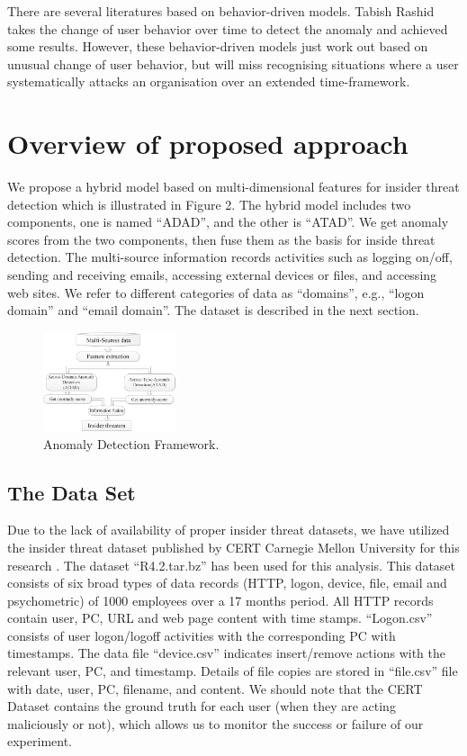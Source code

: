 \documentclass[conference]{IEEEtran}
\begin{document}
There are several literatures based on behavior-driven models\cite{b7}\cite{b11}\cite{b12}. 
Tabish Rashid \cite{b17} takes the change of user behavior  over time to detect the anomaly and achieved some results. However, these behavior-driven models just work out based on unusual change of user behavior, but will miss recognising situations where a user systematically attacks an organisation over an extended time-framework.




\section{Overview of proposed approach}

We propose a hybrid model based on multi-dimensional features for insider threat detection which is illustrated in Figure 2. The hybrid model includes two components, one is named ``ADAD'', and the other is ``ATAD''. We get anomaly scores from the two components, then fuse them as the basis for inside threat detection.  The multi-source information records activities such as logging on/off, sending and receiving emails, accessing external devices or files, and
accessing web sites. We refer to different categories of data as “domains”, e.g., “logon domain” and “email domain”. The dataset is described in the next section. 


\begin{figure}[htb]
\centerline{\includegraphics[width = 0.35\textwidth]{figure/figure2.eps}}
\caption{Anomaly Detection Framework.}
\label{fig}
\end{figure}

\subsection{The Data Set}

Due to the lack of availability of proper insider threat datasets, we have utilized the insider threat dataset published by CERT Carnegie Mellon University for this research \cite{b17}. The dataset “R4.2.tar.bz” has been used for this analysis. This dataset consists of six broad types of data records (HTTP, logon, device, file, email and psychometric) of 1000 employees over a 17 months period. All HTTP records contain user, PC, URL and web page content with time stamps. “Logon.csv” consists of user logon/logoff activities with the corresponding PC with timestamps. The data file “device.csv” indicates insert/remove actions with the relevant user, PC, and timestamp. Details of file copies are stored in “file.csv” file with date, user, PC, filename, and content. We should note that the CERT Dataset contains the ground truth for each user (when they are acting maliciously or not), which allows us to monitor the success or failure of our experiment.
\end{document}
